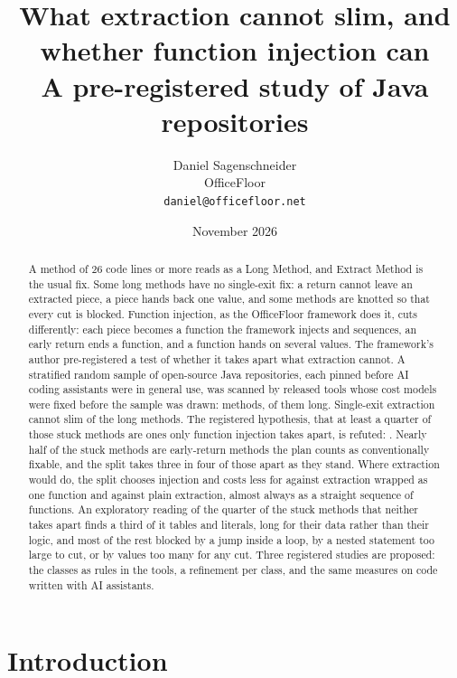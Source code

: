 \documentclass[11pt,a4paper]{article}
\title{\bfseries What extraction cannot slim, and whether function injection can\\
A pre-registered study of \nUsable{} Java repositories}
\author{Daniel Sagenschneider\\\small OfficeFloor\\\small\texttt{daniel@officefloor.net}\doiline}
\date{November 2026}
\begin{document}
\maketitle

\begin{abstract}
\noindent
A method of 26 code lines or more reads as a Long Method, and Extract Method
is the usual fix. Some long methods have no single-exit fix: a return cannot
leave an extracted piece, a piece hands back one value, and some methods are
knotted so that every cut is blocked. Function injection, as the OfficeFloor
framework does it, cuts differently: each piece becomes a function the
framework injects and sequences, an early return ends a function, and a
function hands on several values. The framework's author pre-registered a
test of whether it takes apart what extraction cannot. A stratified random
sample of \nUsable{} open-source Java repositories, each pinned before AI
coding assistants were in general use, was scanned by released tools whose
cost models were fixed before the sample was drawn: \nMethods{} methods,
\nLong{} of them long. Single-exit extraction cannot slim \stuckShare{} of the long methods.
The registered hypothesis, that at least a quarter of those stuck methods are
ones only function injection takes apart, is refuted: \ciCatThreeC{}. Nearly
half of the stuck methods are early-return methods the plan counts as
conventionally fixable, and the split takes three in four of those apart as
they stand. Where extraction would do, the split chooses injection and costs
less for \popImproved{} against extraction wrapped as one function and
\popImprovedStrict{} against plain extraction, almost always as a straight
sequence of functions. An exploratory reading of the quarter of the stuck
methods that neither takes apart finds a third of it tables and literals,
long for their data rather than their logic, and most of the rest blocked by
a jump inside a loop, by a nested statement too large to cut, or by values
too many for any cut. Three registered studies are proposed: the classes as
rules in the tools, a refinement per class, and the same measures on code
written with AI assistants.
\end{abstract}

\section{Introduction}
\end{document}
